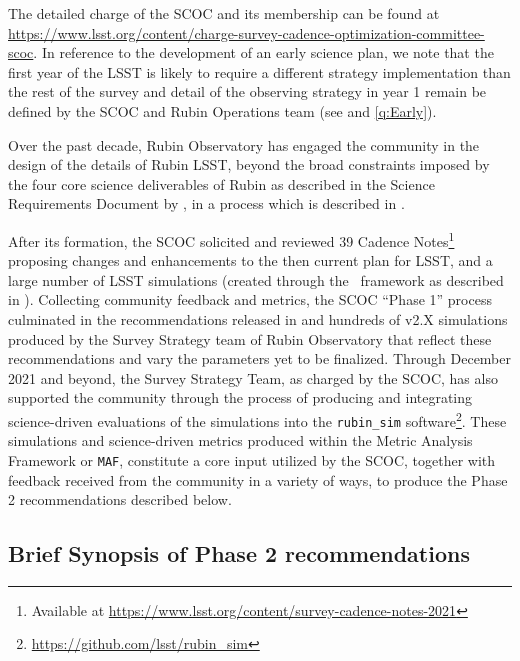The detailed charge of the SCOC and its membership can be found at \url{https://www.lsst.org/content/charge-survey-cadence-optimization-committee-scoc}. In reference to the development of an early science plan, we note that the first year of the LSST is likely to require a different strategy implementation than the rest of the survey and detail of the observing strategy in year 1 remain be defined by the SCOC and Rubin Operations team (see \citealt{rtn-011} and \autoref{q:Early}).

Over the past decade, Rubin Observatory has engaged the community in the design of the details of Rubin LSST, beyond the broad constraints imposed by the four core science deliverables of Rubin as described in the Science Requirements Document by \citet[][hereafter SRD]{LPM-17}, in a process which is described in \citet{2022ApJS..258....1B}. 

After its formation, the SCOC solicited %
and reviewed 39 Cadence Notes\footnote{\label{fn:cnotes}Available at \url{https://www.lsst.org/content/survey-cadence-notes-2021}} proposing changes and enhancements to the then current plan for LSST, and a large number of LSST simulations (created through the \opsim\ framework as described in \citealt[][hereafter PSTN-051]{PSTN-051}). Collecting community feedback and metrics, the SCOC ``Phase 1'' process culminated in the recommendations released in  and hundreds of v2.X simulations produced by the Survey Strategy team of Rubin Observatory that reflect these recommendations and vary the parameters yet to be finalized. 
Through December 2021 and beyond, the Survey Strategy Team, as charged by the SCOC, has also supported the community through the process of producing and integrating science-driven evaluations of the simulations into the \texttt{rubin\_sim} software\footnote{\url{https://github.com/lsst/rubin_sim}}. These simulations and science-driven metrics produced within the Metric Analysis Framework \citep{2014SPIE.9149E..0BJ} or \texttt{MAF},  constitute a core input utilized by the SCOC, together with feedback received from the community in a variety of ways, to produce the Phase 2 recommendations described below. 




\subsection{Brief Synopsis of Phase 2 recommendations}\label{sec:shortrec}

